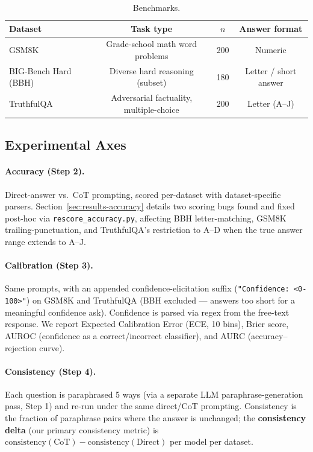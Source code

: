 \documentclass{article}
\begin{document}
\begin{table}[h]
\centering
\caption{Benchmarks.}
\label{tab:benchmarks}
\begin{tabular}{lccc}
\toprule
Dataset & Task type & $n$ & Answer format \\
\midrule
GSM8K & Grade-school math word problems & 200 & Numeric \\
BIG-Bench Hard (BBH) & Diverse hard reasoning (subset) & 180 & Letter / short answer \\
TruthfulQA & Adversarial factuality, multiple-choice & 200 & Letter (A--J) \\
\bottomrule
\end{tabular}
\end{table}

\subsection{Experimental Axes}

\paragraph{Accuracy (Step 2).} Direct-answer vs.\ CoT prompting, scored per-dataset with dataset-specific parsers. Section~\ref{sec:results-accuracy} details two scoring bugs found and fixed post-hoc via \texttt{rescore\_accuracy.py}, affecting BBH letter-matching, GSM8K trailing-punctuation, and TruthfulQA's restriction to A--D when the true answer range extends to A--J.

\paragraph{Calibration (Step 3).} Same prompts, with an appended confidence-elicitation suffix (\texttt{"Confidence: <0-100>"}) on GSM8K and TruthfulQA (BBH excluded --- answers too short for a meaningful confidence ask). Confidence is parsed via regex from the free-text response. We report Expected Calibration Error (ECE, 10 bins), Brier score, AUROC (confidence as a correct/incorrect classifier), and AURC (accuracy--rejection curve).

\paragraph{Consistency (Step 4).} Each question is paraphrased 5 ways (via a separate LLM paraphrase-generation pass, Step 1) and re-run under the same direct/CoT prompting. Consistency is the fraction of paraphrase pairs where the answer is unchanged; the \textbf{consistency delta} (our primary consistency metric) is $\text{consistency}(\text{CoT}) - \text{consistency}(\text{Direct})$ per model per dataset.
\end{document}
